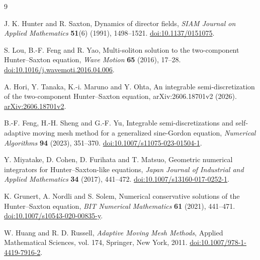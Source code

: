 \documentclass[11pt,a4paper]{article}
\begin{document}
\FloatBarrier
\renewcommand{\refname}{References}
\begin{thebibliography}{9}

J. K. Hunter and R. Saxton,
Dynamics of director fields,
\textit{SIAM Journal on Applied Mathematics} \textbf{51}(6) (1991), 1498--1521.
\href{https://doi.org/10.1137/0151075}{doi:10.1137/0151075}.

S. Lou, B.-F. Feng and R. Yao,
Multi-soliton solution to the two-component Hunter--Saxton equation,
\textit{Wave Motion} \textbf{65} (2016), 17--28.
\href{https://doi.org/10.1016/j.wavemoti.2016.04.006}{doi:10.1016/j.wavemoti.2016.04.006}.

A. Hori, Y. Tanaka, K.-i. Maruno and Y. Ohta,
An integrable semi-discretization of the two-component Hunter--Saxton equation,
arXiv:2606.18701v2 (2026).
\href{https://arxiv.org/abs/2606.18701v2}{arXiv:2606.18701v2}.

B.-F. Feng, H.-H. Sheng and G.-F. Yu,
Integrable semi-discretizations and self-adaptive moving mesh method for a generalized sine-Gordon equation,
\textit{Numerical Algorithms} \textbf{94} (2023), 351--370.
\href{https://doi.org/10.1007/s11075-023-01504-1}{doi:10.1007/s11075-023-01504-1}.

Y. Miyatake, D. Cohen, D. Furihata and T. Matsuo,
Geometric numerical integrators for Hunter--Saxton-like equations,
\textit{Japan Journal of Industrial and Applied Mathematics} \textbf{34} (2017), 441--472.
\href{https://doi.org/10.1007/s13160-017-0252-1}{doi:10.1007/s13160-017-0252-1}.

K. Grunert, A. Nordli and S. Solem,
Numerical conservative solutions of the Hunter--Saxton equation,
\textit{BIT Numerical Mathematics} \textbf{61} (2021), 441--471.
\href{https://doi.org/10.1007/s10543-020-00835-y}{doi:10.1007/s10543-020-00835-y}.

W. Huang and R. D. Russell,
\textit{Adaptive Moving Mesh Methods},
Applied Mathematical Sciences, vol. 174, Springer, New York, 2011.
\href{https://doi.org/10.1007/978-1-4419-7916-2}{doi:10.1007/978-1-4419-7916-2}.

\end{thebibliography}
\end{document}
